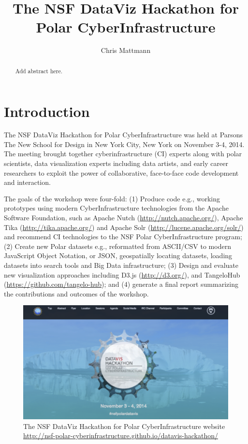 \documentclass[11pt]{article}
\begin{document}
\title{The NSF DataViz Hackathon for Polar CyberInfrastructure}
\author{Chris Mattmann}

\maketitle
\begin{abstract}
Add abstract here.
\end{abstract}


\section{Introduction}
The NSF DataViz Hackathon for Polar CyberInfrastructure was held at Parsons The New School for Design in New York City, New York on November 3-4, 2014. The meeting brought together cyberinfrastructure (CI) experts along with polar scientists, data visualization experts including data artists, and early career researchers to exploit the power of collaborative, face-to-face code development and interaction. 

The goals of the workshop were four-fold: (1) Produce code e.g., working prototypes using modern CyberInfrastructure technologies from the Apache Software Foundation, such as Apache Nutch (\url{http://nutch.apache.org/}), Apache Tika (\url{http://tika.apache.org/}) and Apache Solr (\url{http://lucene.apache.org/solr/}) and recommend CI technologies to the NSF Polar CyberInfrastructure program; (2) Create new Polar datasets e.g., reformatted from ASCII/CSV to modern JavaScript Object Notation, or JSON, geospatially locating datasets, loading datasets into search tools and Big Data infrastructure; (3) Design and evaluate new visualization approaches including D3.js (\url{http://d3.org/}), and TangeloHub (\url{https://github.com/tangelo-hub}); and (4) generate a final report summarizing the contributions and outcomes of the workshop. 

\begin{figure}[htp]
    \centering
    \includegraphics[width=5in]{figs/fig1.png}
    \caption{The NSF DataViz Hackathon for Polar CyberInfrastructure website \protect\url{http://nsf-polar-cyberinfrastructure.github.io/datavis-hackathon/}}
    \label{fig:website}
\end{figure}
\end{document}
